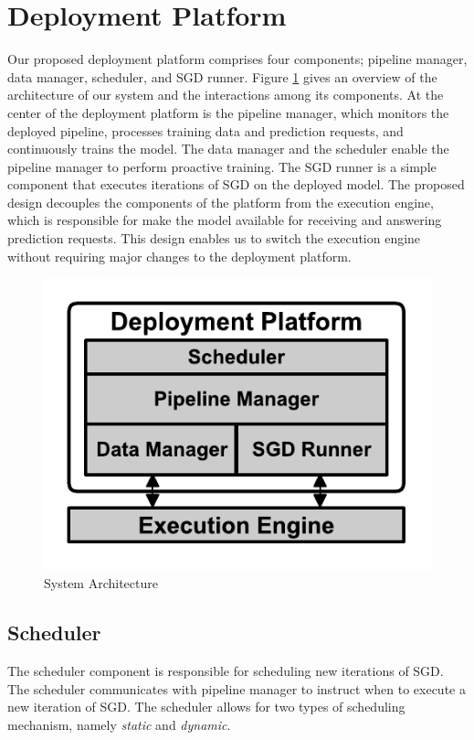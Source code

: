 \section{Deployment Platform} \label{sec:system-architecture}
Our proposed deployment platform comprises four components; pipeline manager, data manager, scheduler, and SGD runner.
Figure \ref{fig:system-architecture} gives an overview of the architecture of our system and the interactions among its components.
At the center of the deployment platform is the pipeline manager, which monitors the deployed pipeline, processes training data and prediction requests, and continuously trains the model.
The data manager and the scheduler enable the pipeline manager to perform proactive training.
The SGD runner is a simple component that executes iterations of SGD on the deployed model.
The proposed design decouples the components of the platform from the execution engine, which is responsible for make the model available for receiving and answering prediction requests.
This design enables us to switch the execution engine without requiring major changes to the deployment platform.

\begin{figure}[t]
\centering
\includegraphics[width=\columnwidth]{../images/system-architecture.pdf}
\caption{System Architecture}
\label{fig:system-architecture}
\end{figure}

\subsection{Scheduler}\label{scheduler}
The scheduler component is responsible for scheduling new iterations of SGD.
The scheduler communicates with pipeline manager to instruct when to execute a new iteration of SGD.
The scheduler allows for two types of scheduling mechanism, namely \textit{static} and \textit{dynamic}.

